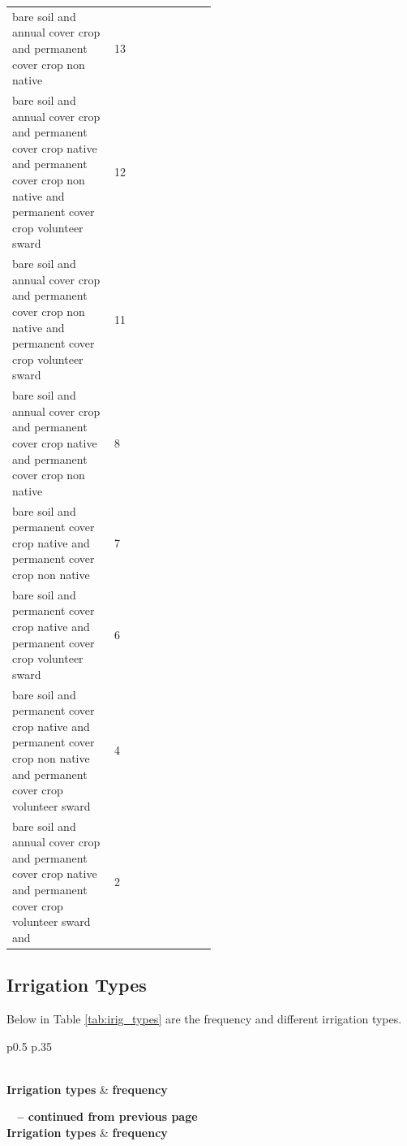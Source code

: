 \documentclass[review,12pt,authoryear]{elsarticle}
\begin{document}
\begin{linenumbers}
\begin{center}
\begin{longtable}{p{0.5\linewidth} p{.35\linewidth}}
  bare soil and annual cover crop and permanent cover crop non native & 13 \\
  bare soil and annual cover crop and permanent cover crop native and permanent cover crop non native and permanent cover crop volunteer sward & 12 \\
  bare soil and annual cover crop and permanent cover crop non native and permanent cover crop volunteer sward & 11 \\
  bare soil and annual cover crop and permanent cover crop native and permanent cover crop non native & 8 \\
  bare soil and permanent cover crop native and permanent cover crop non native & 7 \\
  bare soil and permanent cover crop native and permanent cover crop volunteer sward & 6 \\
  bare soil and permanent cover crop native and permanent cover crop non native and permanent cover crop volunteer sward & 4 \\
  bare soil and annual cover crop and permanent cover crop native and permanent cover crop volunteer sward and & 2 \\
  \end{longtable}
  \end{center}
  \clearpage


\subsection{Irrigation Types}
Below in Table \ref{tab:irig_types} are the frequency and different irrigation types.

\begin{center}
  \begin{longtable}{p{0.5\linewidth} p{.35\linewidth}}
    \caption{Frequency and class types of irrigation types used by vineyards.}\label{tab:irig_types} \\
  
  \hline \textbf{Irrigation types} & \textbf{frequency}\\ \hline 
  \endfirsthead
  
  {{\bfseries \tablename\ \thetable{} -- continued from previous page}} \\
  \hline \textbf{Irrigation types} & \textbf{frequency} \\ \hline 
  \endhead
  
  \hline {} \\ \hline
  \endfoot
  

\end{longtable}
\end{center}
\end{linenumbers}
\end{document}
